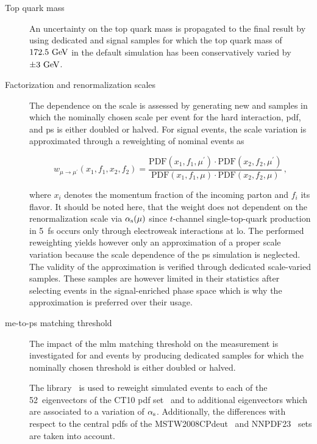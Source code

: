 \begin{description}
\item[Top quark mass] An uncertainty on the top quark mass is propagated to the final result by using dedicated \ttbar and signal samples for which the top quark mass of $172.5~\textrm{GeV}$ in the default simulation has been conservatively varied by $\pm3~\textrm{GeV}$.

\item[Factorization and renormalization scales] The dependence on the scale is assessed by generating new \ttbar and \wjets samples in which the nominally chosen scale per event for the hard interaction, \gls{pdf}, and \gls{ps} is either doubled or halved. For signal events, the scale variation is approximated through a reweighting of nominal events as

\begin{equation}
w_{\mu\to \mu^\prime}(x_1,f_1,x_2,f_2)=\frac{\mathrm{PDF}(x_{1},f_{1},\mu^\prime)\cdot\mathrm{PDF}(x_{2},f_{2},\mu^\prime)}{\mathrm{PDF}(x_{1},f_{1},\mu)\cdot\mathrm{PDF}(x_{2},f_{2},\mu)}\,,
\end{equation}

where $x_{i}$ denotes the momentum fraction of the incoming parton and $f_{i}$ its flavor. It should be noted here, that the weight does not dependent on the renormalization scale via ${\alpha_\textrm{s}}(\mu)$ since $t$-channel single-top-quark production in 5~\gls{fs} occurs only through electroweak interactions at \gls{lo}. The performed reweighting yields however only an approximation of a proper scale variation because the scale dependence of the \gls{ps} simulation is neglected. The validity of the approximation is verified through dedicated scale-varied samples. These samples are however limited in their statistics after selecting events in the signal-enriched phase space which is why the approximation is preferred over their usage.
\item[\gls{me}-to-\gls{ps} matching threshold] The impact of the \gls{mlm} matching threshold on the measurement is investigated for \ttbar and \wjets events by producing dedicated samples for which the nominally chosen threshold is either doubled or halved.
 
\item[] The \LHAPDF library~\cite{Buckley:2014ana} is used to reweight simulated events to each of the 52~eigenvectors of the CT10 \gls{pdf} set~\cite{Lai:2010vv} and to additional eigenvectors which are associated to a variation of ${\alpha_\textrm{s}}$. Additionally, the differences with respect to the central \glspl{pdf} of the MSTW2008CPdeut~\cite{Martin:2012da} and NNPDF23~\cite{Ball:2012cx} sets are taken into account.
\end{description}



